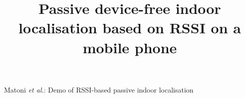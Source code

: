 \documentclass[journal]{IEEEtran}
\begin{document}
%
\title{Passive device-free indoor localisation based on RSSI on a mobile phone}
%
%
%


\author{
}
% 
%



%
{Matoni \MakeLowercase{\textit{et al.}}: Demo of RSSI-based passive indoor localisation}
% 
\end{document}

